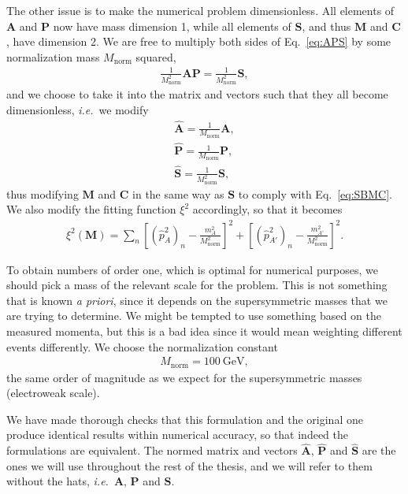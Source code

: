 \documentclass[twoside,english]{uiofysmaster}
\begin{document}
The other issue is to make the numerical problem dimensionless. All elements of $\mathbf{A}$ and $\mathbf{P}$ now have mass dimension 1, while all elements of $\mathbf{S}$, and thus $\mathbf{M}$ and $\mathbf{C}$, have dimension 2. We are free to multiply both sides of Eq.\ \eqref{eq:APS} by some normalization mass $M_\mathrm{norm}$ squared,
\begin{align}
	\frac{1}{M_\mathrm{norm}^2} \mathbf{A}\mathbf{P} = \frac{1}{M_\mathrm{norm}^2} \mathbf{S},
\end{align}
and we choose to take it into the matrix and vectors such that they all become dimensionless, {\it i.e.}\ we modify
\begin{align}
	\mathbf{\hat A} = \frac{1}{M_\mathrm{norm}}\mathbf{A},\nonumber \\
	\mathbf{\hat P} = \frac{1}{M_\mathrm{norm}}\mathbf{P},\label{eq:vectors_normalized}\\
	\mathbf{\hat S} = \frac{1}{M_\mathrm{norm}^2}\mathbf{S},\nonumber 
\end{align}
thus modifying $\mathbf{M}$ and $\mathbf{C}$ in the same way as $\mathbf{S}$ to comply with Eq.\ \eqref{eq:SBMC}. We also modify the fitting function $\xi^2$ accordingly, so that it becomes
\begin{align}
	\xi^2(\mathbf{M}) = \sum_n \left[(\hat p_{A}^2)_n - \frac{m_A^2}{M_\mathrm{norm}^2}\right]^2 + \left[(\hat p_{A'}^2)_n - \frac{m_{A'}^2}{M_\mathrm{norm}^2}\right]^2.\label{eq:xisquared_modified}
\end{align}

To obtain numbers of order one, which is optimal for numerical purposes, we should pick a mass of the relevant scale for the problem. This is not something that is known {\it a priori}, since it depends on the supersymmetric masses that we are trying to determine. We might be tempted to use something based on the measured momenta, but this is a bad idea since it would mean weighting different events differently. We choose the normalization constant
\begin{align}
	M_\mathrm{norm} = 100 ~\mathrm{GeV},
\end{align}
the same order of magnitude as we expect for the supersymmetric masses (electroweak scale). 

We have made thorough checks that this formulation and the original one produce identical results within numerical accuracy, so that indeed the formulations are equivalent. The normed matrix and vectors $\mathbf{\hat A}$, $\mathbf{\hat P}$ and $\mathbf{\hat S}$ are the ones we will use throughout the rest of the thesis, and we will refer to them without the hats, {\it i.e.}\ $\mathbf A$, $\mathbf P$ and $\mathbf S$.
\end{document}

